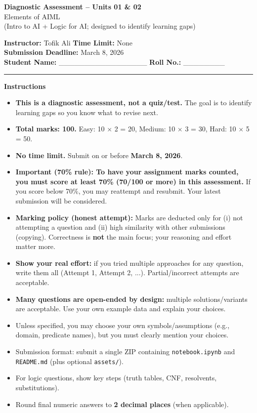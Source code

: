 \documentclass[11pt,a4paper]{article}
\newcommand{\SubmissionDeadline}{March 8, 2026}
\begin{document}
\begin{center}
  {\LARGE \textbf{Diagnostic Assessment -- Units 01 \& 02}}\\[0.25em]
  {\large Elements of AIML}\\[0.25em]
  \normalsize (Intro to AI + Logic for AI; designed to identify learning gaps)
\end{center}

\noindent
\textbf{Instructor:} Tofik Ali \hfill \textbf{Time Limit:} None\\
\textbf{Submission Deadline:} \SubmissionDeadline\\
\textbf{Student Name:} \_\_\_\_\_\_\_\_\_\_\_\_\_\_\_\_\_ \hfill \textbf{Roll No.:} \_\_\_\_\_\_\_\_\\

\vspace{0.6em}
\hrule
\vspace{0.8em}

\textbf{Instructions}
\begin{itemize}[leftmargin=*]
  \item \textbf{This is a diagnostic assessment, not a quiz/test.} The goal is to identify learning gaps so you know what to revise next.
  \item \textbf{Total marks: 100.} Easy: 10 $\times$ 2 = 20, Medium: 10 $\times$ 3 = 30, Hard: 10 $\times$ 5 = 50.
  \item \textbf{No time limit.} Submit on or before \textbf{\SubmissionDeadline}.
  \item \textbf{Important (70\% rule): To have your assignment marks counted, you must score at least 70\% (70/100 or more) in this assessment.}
    If you score below 70\%, you may reattempt and resubmit. Your latest submission will be considered.
  \item \textbf{Marking policy (honest attempt):} Marks are deducted only for (i) not attempting a question and (ii) high similarity with other submissions (copying).
    Correctness is \textbf{not} the main focus; your reasoning and effort matter more.
  \item \textbf{Show your real effort:} if you tried multiple approaches for any question, write them all (Attempt 1, Attempt 2, ...). Partial/incorrect attempts are acceptable.
  \item \textbf{Many questions are open-ended by design:} multiple solutions/variants are acceptable. Use your own example data and explain your choices.
  \item Unless specified, you may choose your own symbols/assumptions (e.g., domain, predicate names), but you must clearly mention your choices.
  \item Submission format: submit a single ZIP containing \texttt{notebook.ipynb} and \texttt{README.md} (plus optional \texttt{assets/}).
  \item For logic questions, show key steps (truth tables, CNF, resolvents, substitutions).
  \item Round final numeric answers to \textbf{2 decimal places} (when applicable).
\end{itemize}
\end{document}
